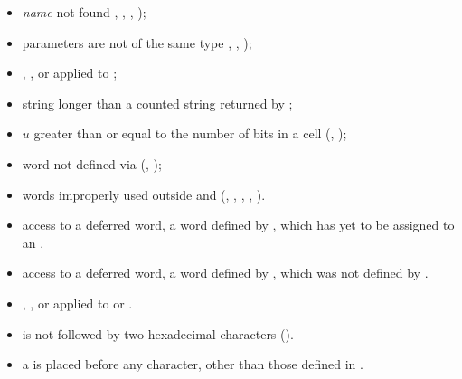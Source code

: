 \begin{itemize}
\item \emph{name} not found ,
	, ,
	);

\item parameters are not of the same type ,
	, );

\item {},
	,
	 or
	 applied to ;

\item string longer than a counted string returned by
	;

\item $u$ greater than or equal to the number of bits in a cell
	(, );

\item word not defined via 
	(, );

\item words improperly used outside
	 and 
	(, ,
	 ,
	 ,
	 ).
\end{itemize}


\begin{itemize}
\item access to a deferred word, a word defined by ,
	which has yet to be assigned to an .

\item access to a deferred word, a word defined by ,
	which was not defined by .

\item {}, ,
	 or  applied to 
	or .
\end{itemize}


\begin{itemize}
	\item {} is not followed by two hexadecimal characters ().
	\item a \bs{} is placed before any character, other than those defined in
		.
\end{itemize}



